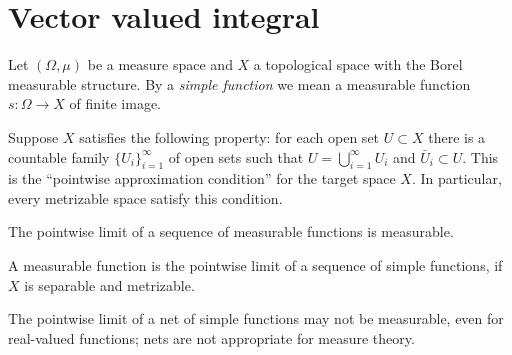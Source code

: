 \documentclass[a4paper]{article}
\begin{document}
\section{Vector valued integral}
\begin{prb}
Let $(\Omega,\mu)$ be a measure space and $X$ a topological space with the Borel measurable structure.
By a \emph{simple function} we mean a measurable function $s:\Omega\to X$ of finite image.

Suppose $X$ satisfies the following property: for each open set $U\subset X$ there is a countable family $\{U_i\}_{i=1}^\infty$ of open sets such that $U=\bigcup_{i=1}^\infty U_i$ and $\bar U_i\subset U$.
This is the ``pointwise approximation condition'' for the target space $X$.
In particular, every metrizable space satisfy this condition.
\begin{parts}
\item The pointwise limit of a sequence of measurable functions is measurable.
\item A measurable function is the pointwise limit of a sequence of simple functions, if $X$ is separable and metrizable.
\item The pointwise limit of a net of simple functions may not be measurable, even for real-valued functions; nets are not appropriate for measure theory.
\end{parts}
\end{prb}
\end{document}
